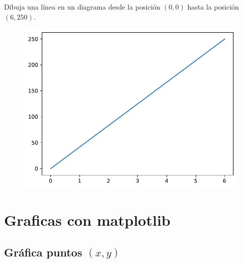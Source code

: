 \begin{code} Dibuja una línea en un diagrama desde la posición \((0,0)\) hasta la posición \((6,250)\).

\begin{Shaded}
\begin{Highlighting}[]

\OperatorTok{=}\NormalTok{ np.array([}\NormalTok{, }\NormalTok{])}
\OperatorTok{=}\NormalTok{ np.array([}\NormalTok{, }\NormalTok{])}

\end{Highlighting}
\end{Shaded}
\begin{figure}
  \centering
  \includegraphics[scale=0.6]{img/grafica1001.pdf}
\end{figure}

\end{code}

\section{Graficas con matplotlib}

\subsection{\texorpdfstring{Gráfica puntos \((x, y)\)}{Gráfica puntos (x, y)}}

